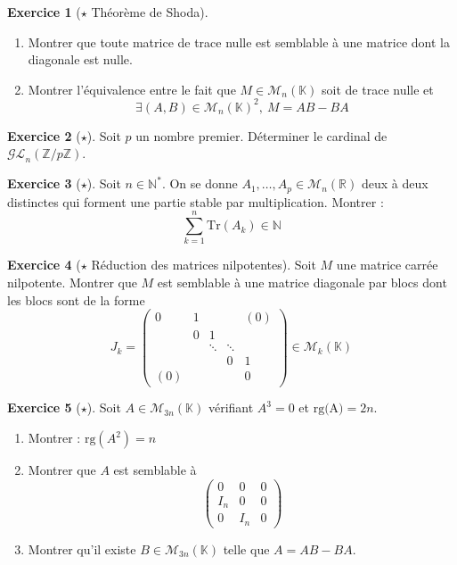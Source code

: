 \documentclass[french]{book}
\newcommand{\N}{\mathbb{N}}
\newcommand{\Z}{\mathbb{Z}}
\newcommand{\R}{\mathbb{R}}
\newcommand{\K}{\mathbb{K}}
\newcommand{\st}{^*}
\newcommand{\Tr}{\text{Tr}}
\theoremstyle{definition}
\newtheorem{ex}{Exercice}[chapter]
\theoremstyle{theorem}
\theoremstyle{remark}
\begin{document}
\begin{ex}[$\star$ Théorème de Shoda]
	\begin{enumerate}
		\item Montrer que toute matrice de trace nulle est semblable à une matrice dont la diagonale est nulle.
		\item Montrer l'équivalence entre le fait que $M\in\mathcal{M}_n(\K)$ soit de trace nulle et $$\exists(A,B)\in\mathcal{M}_n(\K)^2,\ M=AB-BA$$
	\end{enumerate}
\end{ex}

\begin{ex}[$\star$]
	Soit $p$ un nombre premier. Déterminer le cardinal de $\mathcal{GL}_n(\Z/p\Z)$.
\end{ex}

\begin{ex}[$\star$]
	Soit $n\in\N\st$. On se donne $A_1,\ldots,A_p\in\mathcal{M}_n(\R)$ deux à deux distinctes qui forment une partie stable par multiplication. Montrer : $$\sum_{k=1}^{n}\Tr(A_k)\in\N$$
\end{ex}

\begin{ex}[$\star$ Réduction des matrices nilpotentes]
	Soit $M$ une matrice carrée nilpotente. Montrer que $M$ est semblable à une matrice diagonale par blocs dont les blocs sont de la forme $$J_k=\begin{pmatrix}
		0&1&&&(0)\\
		&0&1&&\\
		&&\ddots&\ddots&\\
		&&&0&1\\
		(0)&&&&0
	\end{pmatrix}\in\mathcal{M}_k(\K)$$
\end{ex}

\begin{ex}[$\star$]
	Soit $A\in\mathcal{M}_{3n}(\K)$ vérifiant $A^3=0$ et $\text{rg(A)}=2n$.
	\begin{enumerate}
		\item Montrer : $\text{rg}(A^2)=n$
		\item Montrer que $A$ est semblable à $$\begin{pmatrix}
			0&0&0\\
			I_n&0&0\\
			0&I_n&0
		\end{pmatrix}$$
		\item Montrer qu'il existe $B\in\mathcal{M}_{3n}(\K)$ telle que $A=AB-BA$.
	\end{enumerate}
\end{ex}
\end{document}
